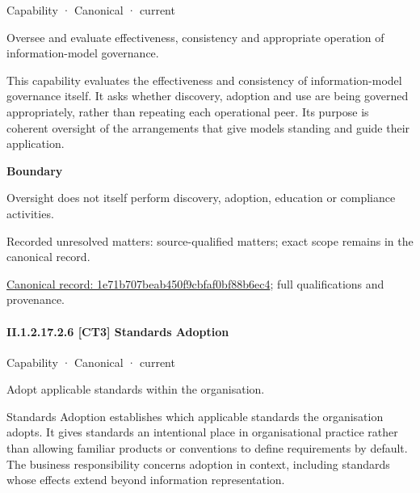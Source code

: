 \label{element:1e71b707beab450f9cbfaf0bf88b6ec4}
{\small Capability · Canonical · current}\par

Oversee and evaluate effectiveness, consistency and appropriate operation of information-model governance.



This capability evaluates the effectiveness and consistency of information-model governance itself. It asks whether discovery, adoption and use are being governed appropriately, rather than repeating each operational peer. Its purpose is coherent oversight of the arrangements that give models standing and guide their application.



\textbf{Boundary}



Oversight does not itself perform discovery, adoption, education or compliance activities.


{\small Recorded unresolved matters: source-qualified matters; exact scope remains in the canonical record.}\par
{\footnotesize \href{../../../../continuum/strategy/capability/1e71b707beab450f9cbfaf0bf88b6ec4.md}{Canonical record: 1e71b707beab450f9cbfaf0bf88b6ec4}; full qualifications and provenance.}\par
\paragraph*{II.1.2.17.2.6 [CT3] Standards Adoption}
\label{navigation:II.1.2.17.2.6}

\label{element:0d59f956f5714d3985398f09aeb7c541}
{\small Capability · Canonical · current}\par

Adopt applicable standards within the organisation.



Standards Adoption establishes which applicable standards the organisation adopts. It gives standards an intentional place in organisational practice rather than allowing familiar products or conventions to define requirements by default. The business responsibility concerns adoption in context, including standards whose effects extend beyond information representation.



